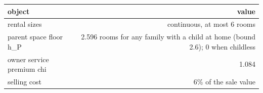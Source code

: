 \begingroup\small
\setlength{\tabcolsep}{3pt}
\renewcommand{\arraystretch}{1.04}
\begin{tabularx}{\linewidth}{Xr}
\toprule
object & value \\
\midrule
rental sizes & continuous, at most 6 rooms \\
parent space floor h\_P & 2.596 rooms for any family with a child at home (bound 2.6); 0 when childless \\
owner service premium chi & 1.084 \\
selling cost & 6\% of the sale value \\
\bottomrule
\end{tabularx}
\endgroup
